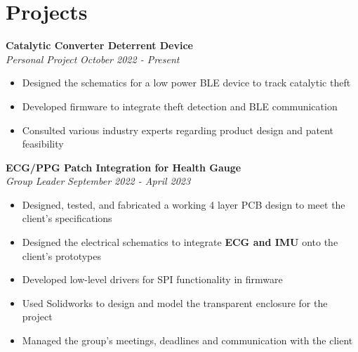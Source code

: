 \documentclass[letterpaper,20pt]{article}
\begin{document}
\vspace{-8pt}
\section{Projects}


\vspace{-1pt}
\textbf{Catalytic Converter Deterrent Device} \\
\textit{Personal Project} \hspace{11.85cm}
\textit{October 2022 - Present}
\vspace{-6pt}
\begin{itemize} %
\item Designed the schematics for a low power BLE device to track catalytic theft \vspace{-5pt}
\item Developed firmware to integrate theft detection and BLE communication \vspace{-5pt}
\item Consulted various industry experts regarding product design and patent feasibility 
\end{itemize}

\vspace{-1pt}
\textbf{ECG/PPG Patch Integration for Health Gauge} \\
\textit{Group Leader} \hspace{11.5cm}
\textit{September 2022 - April 2023}
\vspace{-5pt}
\begin{itemize}
\item Designed, tested, and fabricated a working 4 layer PCB design to meet the client's specifications \vspace{-5pt}
\item Designed the electrical schematics to integrate \textbf{ECG and IMU} onto the client's prototypes \vspace{-5pt}
\item Developed low-level drivers for SPI functionality in firmware \vspace{-5pt}
\item Used Solidworks to design and model the transparent enclosure for the project \vspace{-5pt}
\item Managed the group's meetings, deadlines and communication with the client
\end{itemize}
\end{document}
